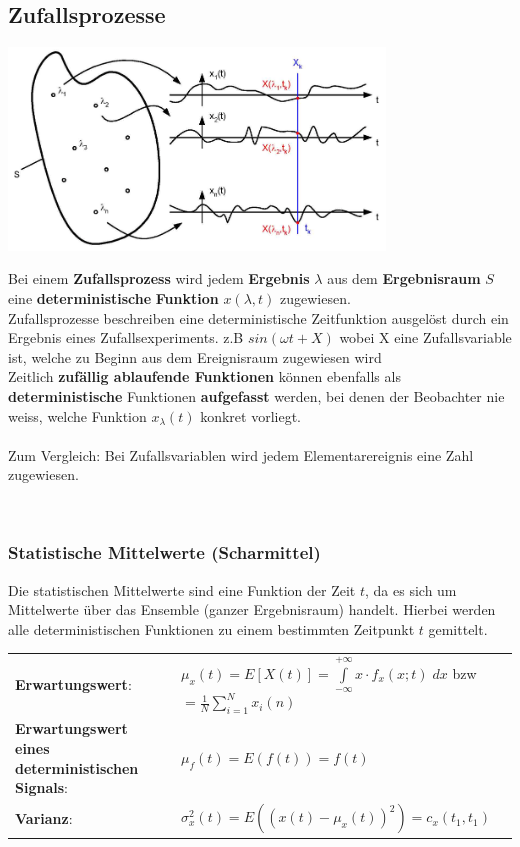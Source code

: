\subsection{Zufallsprozesse}
\begin{minipage}{10.3cm}
	\includegraphics[width=10cm]{bilder/zufallsprozess.png}
\end{minipage}
\begin{minipage}{8.5cm}
	Bei einem \textbf{Zufallsprozess} wird jedem \textbf{Ergebnis} \boldmath$\lambda$ aus 
	dem \textbf{Ergebnisraum} $S$ eine \textbf{deterministische} \textbf{Funktion} $x(\lambda, t)$
	\unboldmath zugewiesen. \\
	Zufallsprozesse beschreiben eine deterministische Zeitfunktion ausgelöst durch ein Ergebnis eines
	Zufallsexperiments. z.B $sin(\omega t + X)$ wobei X eine Zufallsvariable ist, welche zu Beginn aus dem Ereignisraum zugewiesen wird\\
	Zeitlich \textbf{zufällig ablaufende Funktionen} können ebenfalls als \textbf{deterministische} Funktionen 
	\textbf{aufgefasst} werden, bei denen der Beobachter nie weiss, welche Funktion $x_\lambda(t)$ konkret
	vorliegt.	\\ \\
	Zum Vergleich: Bei Zufallsvariablen wird jedem Elementarereignis eine Zahl zugewiesen. 
\end{minipage} 
\vspace{0.5cm} \\

\subsubsection{Statistische Mittelwerte (Scharmittel)}
Die statistischen Mittelwerte sind eine Funktion der Zeit $t$, da es sich um Mittelwerte über das
Ensemble (ganzer Ergebnisraum) handelt. Hierbei werden alle deterministischen Funktionen zu einem
bestimmten Zeitpunkt $t$ gemittelt. 

\renewcommand{\arraystretch}{1.4}
\begin{tabular}[c]{ p{4.5cm}  p{13.5 cm}  }
	\textbf{Erwartungswert}: 	&  $\mu_{x}(t) = E\left[X(t)\right] =
          \int\limits_{-\infty}^{+\infty} x \cdot f_{x}(x;t)\;dx$ bzw $=\frac{1}{N}\sum\limits_{i=1}^{N}x_i(n)$ \\
    \textbf{Erwartungswert eines deterministischen Signals}:& $\mu_f(t) = E(f(t))=f(t)$\\
 	\textbf{Varianz}: &         $\sigma_x^2(t)=E((x(t)-\mu_x(t))^2)=c_x(t_1,t_1)$
    
	 
\end{tabular}
\renewcommand{\arraystretch}{1}



